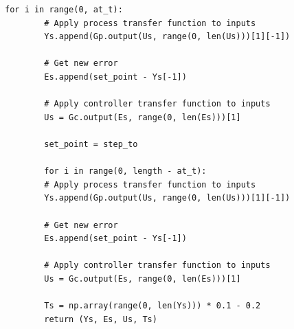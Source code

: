 \documentclass[twoside,a4]{report}
\begin{document}
\begin{Verbatim}[frame=single,fontsize=\footnotesize]
		for i in range(0, at_t):
		# Apply process transfer function to inputs
		Ys.append(Gp.output(Us, range(0, len(Us)))[1][-1])
		
		# Get new error
		Es.append(set_point - Ys[-1])
		
		# Apply controller transfer function to inputs
		Us = Gc.output(Es, range(0, len(Es)))[1]
		
		set_point = step_to
		
		for i in range(0, length - at_t):
		# Apply process transfer function to inputs
		Ys.append(Gp.output(Us, range(0, len(Us)))[1][-1])
		
		# Get new error
		Es.append(set_point - Ys[-1])
		
		# Apply controller transfer function to inputs
		Us = Gc.output(Es, range(0, len(Es)))[1]
		
		Ts = np.array(range(0, len(Ys))) * 0.1 - 0.2
		return (Ys, Es, Us, Ts)
\end{Verbatim}
\end{document}

